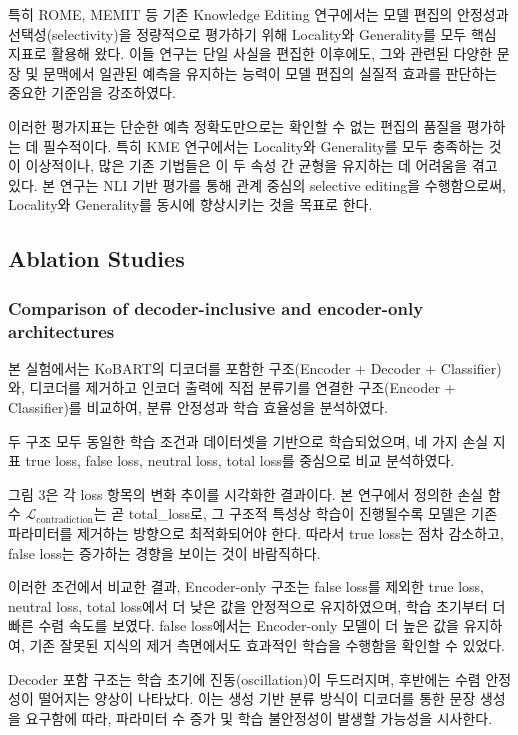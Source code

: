 \documentclass[a4paper,fleqn]{cas-sc}
\begin{document}
특히 ROME, MEMIT 등 기존 Knowledge Editing 연구에서는 모델 편집의 안정성과 선택성(selectivity)을 정량적으로 평가하기 위해 Locality와 Generality를 모두 핵심 지표로 활용해 왔다.
이들 연구는 단일 사실을 편집한 이후에도, 그와 관련된 다양한 문장 및 문맥에서 일관된 예측을 유지하는 능력이 모델 편집의 실질적 효과를 판단하는 중요한 기준임을 강조하였다.

이러한 평가지표는 단순한 예측 정확도만으로는 확인할 수 없는 편집의 품질을 평가하는 데 필수적이다.  
특히 KME 연구에서는 Locality와 Generality를 모두 충족하는 것이 이상적이나, 많은 기존 기법들은 이 두 속성 간 균형을 유지하는 데 어려움을 겪고 있다.  
본 연구는 NLI 기반 평가를 통해 관계 중심의 selective editing을 수행함으로써, Locality와 Generality를 동시에 향상시키는 것을 목표로 한다.



\subsection{Ablation Studies}

\subsubsection{Comparison of decoder-inclusive and encoder-only architectures}

본 실험에서는 KoBART의 디코더를 포함한 구조(Encoder + Decoder + Classifier)와, 디코더를 제거하고 인코더 출력에 직접 분류기를 연결한 구조(Encoder + Classifier)를 비교하여, 분류 안정성과 학습 효율성을 분석하였다.

두 구조 모두 동일한 학습 조건과 데이터셋을 기반으로 학습되었으며, 네 가지 손실 지표 true loss, false loss, neutral loss, total loss를 중심으로 비교 분석하였다.  

그림 3은 각 loss 항목의 변화 추이를 시각화한 결과이다.  
본 연구에서 정의한 손실 함수 \( \mathcal{L}_{\text{contradiction}} \)는 곧 total\_loss로, 그 구조적 특성상 학습이 진행될수록 모델은 기존 파라미터를 제거하는 방향으로 최적화되어야 한다.  
따라서 true loss는 점차 감소하고, false loss는 증가하는 경향을 보이는 것이 바람직하다.

이러한 조건에서 비교한 결과, Encoder-only 구조는 false loss를 제외한 true loss, neutral loss, total loss에서 더 낮은 값을 안정적으로 유지하였으며, 학습 초기부터 더 빠른 수렴 속도를 보였다. 
false loss에서는 Encoder-only 모델이 더 높은 값을 유지하여, 기존 잘못된 지식의 제거 측면에서도 효과적인 학습을 수행함을 확인할 수 있었다.

Decoder 포함 구조는 학습 초기에 진동(oscillation)이 두드러지며, 후반에는 수렴 안정성이 떨어지는 양상이 나타났다. 
이는 생성 기반 분류 방식이 디코더를 통한 문장 생성을 요구함에 따라, 파라미터 수 증가 및 학습 불안정성이 발생할 가능성을 시사한다.
\end{document}
